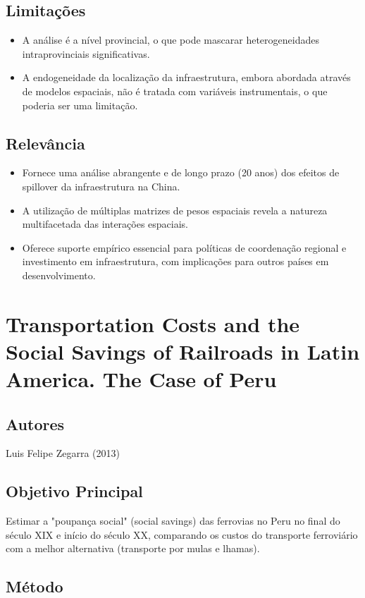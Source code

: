 \documentclass[12pt]{article}
\begin{document}
\subsection*{Limitações}
\begin{itemize}
    \item A análise é a nível provincial, o que pode mascarar heterogeneidades intraprovinciais significativas.
    \item A endogeneidade da localização da infraestrutura, embora abordada através de modelos espaciais, não é tratada com variáveis instrumentais, o que poderia ser uma limitação.
\end{itemize}

\subsection*{Relevância}
\begin{itemize}
    \item Fornece uma análise abrangente e de longo prazo (20 anos) dos efeitos de spillover da infraestrutura na China.
    \item A utilização de múltiplas matrizes de pesos espaciais revela a natureza multifacetada das interações espaciais.
    \item Oferece suporte empírico essencial para políticas de coordenação regional e investimento em infraestrutura, com implicações para outros países em desenvolvimento.
\end{itemize}
\newpage

\section{Transportation Costs and the Social Savings of Railroads in Latin America. The Case of Peru}

\subsection*{Autores}
Luis Felipe Zegarra (2013)

\subsection*{Objetivo Principal}
Estimar a "poupança social" (social savings) das ferrovias no Peru no final do século XIX e início do século XX, comparando os custos do transporte ferroviário com a melhor alternativa (transporte por mulas e lhamas).

\subsection*{Método}
\end{document}
